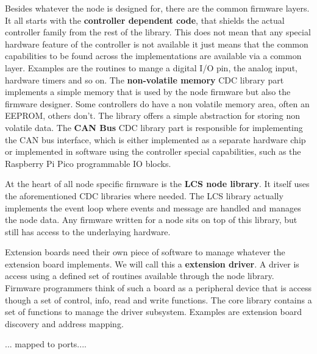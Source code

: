 \begin{center}
\end{center}

Besides whatever the node is designed for, there are the common firmware layers. It all starts with the \textbf{controller dependent code}, that shields the actual controller family from the rest of the library. This does not mean that any special hardware feature of the controller is not available it just means that the common capabilities to be found across the implementations are available via a common layer. Examples are the routines to mange a digital I/O pin, the analog input, hardware timers and so on. The \textbf{non-volatile memory} CDC library part implements a simple memory that is used by the node firmware but also the firmware designer. Some controllers do have a non volatile memory area, often an EEPROM, others don't. The library offers a simple abstraction for storing non volatile data. The \textbf{ CAN Bus} CDC library part is responsible for implementing the CAN bus interface, which is either implemented as a separate hardware chip or implemented in software using the controller special capabilities, such as the Raspberry Pi Pico programmable IO blocks.

At the heart of all node specific firmware is the \textbf{LCS node library}. It itself uses the aforementioned CDC libraries where needed. The LCS library actually implements the event loop where events and message are handled and manages the node data. Any firmware written for a node sits on top of this library, but still has access to the underlaying hardware. 

Extension boards need their own piece of software to manage whatever the extension board implements. We will call this a \textbf{extension driver}. A driver is access using a defined set of routines available through the node library. Firmware programmers think of such a board as a peripheral device that is access though a set of control, info, read and write functions. The core library contains a set of functions to manage the driver subsystem. Examples are extension board discovery and address mapping.

... mapped to ports....

